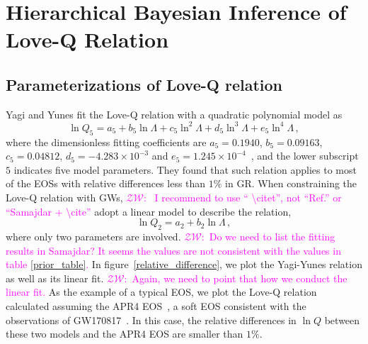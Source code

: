 \documentclass[a4paper,11pt]{article}
\newcommand{\ZW}[1]{\textcolor{magenta}{$\mathcal{ZW}$:~#1}}
\begin{document}
\section{Hierarchical Bayesian Inference of Love-Q Relation}
\label{sec:framework}

\subsection{Parameterizations of Love-Q relation} 
\label{subsec:framework_parameterization}
Yagi and Yunes fit the Love-Q relation with a quadratic polynomial model as~\cite{Yagi:2013bca,Yagi:2013awa,Yagi_2017}
\begin{equation}
\label{5-d_Love_Q_eq}
    \ln Q_{5}=a_5 + b_5 \ln \Lambda + c_5 \ln^2\Lambda + d_5 \ln^3\Lambda + e_5 \ln^4 \Lambda\,,
\end{equation}
where the dimensionless fitting coefficients are 
$a_5=0.1940$, $b_5=0.09163$, $c_5=0.04812$, 
$d_5=-4.283\times 10^{-3}$ and $e_5=1.245\times 10^{-4}$~\cite{Yagi_2017}, and 
the lower subscript $5$ indicates five model parameters.
They found that such relation applies to most of the EOSs with 
relative differences less than $1\%$ in GR. When constraining the Love-Q
relation with GWs, \citet{Samajdar:2020xrd} \ZW{
I recommend to use `` \textbackslash citet'', not ``Ref.'' or ``Samajdar +
\textbackslash cite'' }adopt a linear model to describe the
relation,
\begin{equation}
\label{2-d_Love_Q_eq}
    \ln Q_{2} = a_2 + b_2 \ln \Lambda\,,
\end{equation}
where only two parameters are involved. \ZW{Do we need to list the fitting
results in Samajdar? It seems the values are not consistent with the values in
table \ref{prior_table}.}
In figure~\ref{relative_difference}, we plot the Yagi-Yunes relation as well as 
its linear fit. \ZW{Again, we need to point that how we conduct the linear fit.}
As the example of a typical EOS, we plot the Love-Q relation calculated assuming the APR4 
EOS~\cite{PhysRevC.58.1804}, a soft EOS consistent with the 
observations of GW170817~\cite{LIGOScientific:2017vwq,LIGOScientific:2018cki,
LIGOScientific:2018hze}. In this case, the relative differences in $\ln Q$ between 
these two models and the APR4 EOS are smaller than $1\%$. 
\end{document}
